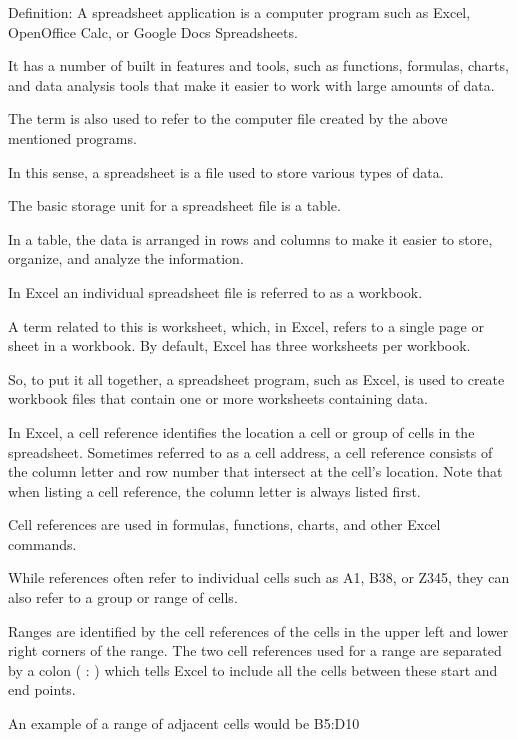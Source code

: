 Definition:
A spreadsheet application is a computer program such as Excel, OpenOffice Calc, or Google Docs Spreadsheets.

It has a number of built in features and tools, such as functions, formulas, charts, and data analysis tools that make it easier to work with large amounts of data.

The term is also used to refer to the computer file created by the above mentioned programs.

In this sense, a spreadsheet is a file used to store various types of data.

The basic storage unit for a spreadsheet file is a table.

In a table, the data is arranged in rows and columns to make it easier to store, organize, and analyze the information.

In Excel an individual spreadsheet file is referred to as a workbook.

A term related to this is worksheet, which, in Excel, refers to a single page or sheet in a workbook. By default, Excel has three worksheets per workbook.

So, to put it all together, a spreadsheet program, such as Excel, is used to create workbook files that contain one or more worksheets containing data.

In Excel, a cell reference identifies the location a cell or group of cells in the spreadsheet. Sometimes referred to as a cell address, a cell reference consists of the column letter and row number that intersect at the cell's location. Note that when listing a cell reference, the column letter is always listed first.

Cell references are used in formulas, functions, charts, and other Excel commands. 

While references often refer to individual cells such as A1, B38, or Z345, they can also refer to a group or range of cells.

Ranges are identified by the cell references of the cells in the upper left and lower right corners of the range. 
The two cell references used for a range are separated by a colon ( : ) which tells Excel to include all the cells between these start and end points. 

An example of a range of adjacent cells would be B5:D10


